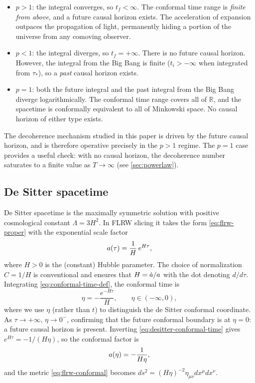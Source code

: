 \begin{itemize}[noitemsep]
  \item $p > 1$: the integral converges, so $t_{f} < \infty$.  The conformal
        time range is \emph{finite from above}, and a future causal horizon
        exists.  The acceleration of expansion outpaces the propagation of
        light, permanently hiding a portion of the universe from any
        comoving observer.
  \item $p < 1$: the integral diverges, so $t_{f} = +\infty$.  There is no
        future causal horizon.  However, the integral from the Big Bang is
        finite ($t_{i} > -\infty$ when integrated from $\tau_{*}$), so a
        \emph{past} causal horizon exists.
  \item $p = 1$: both the future integral and the past integral from the Big
        Bang diverge logarithmically.  The conformal time range covers all of
        $\mathbb{R}$, and the spacetime is conformally equivalent to all of
        Minkowski space.  No causal horizon of either type exists.
\end{itemize}

The decoherence mechanism studied in this paper is driven by the future causal
horizon, and is therefore operative precisely in the $p > 1$ regime.  The
$p = 1$ case provides a useful check: with no causal horizon, the decoherence
number saturates to a finite value as $T \to \infty$ (see
\cref{sec:powerlaw}).

\subsection{De Sitter spacetime}
\label{sec:flrw-desitter}

De Sitter spacetime is the maximally symmetric solution with positive
cosmological constant $\Lambda = 3H^{2}$.  In FLRW slicing it takes the form
\cref{eq:flrw-proper} with the exponential scale factor
%
\begin{equation}
  a(\tau) = \frac{1}{H}\,e^{H\tau} ,
  \label{eq:scale-factor-desitter}
\end{equation}
%
where $H > 0$ is the (constant) Hubble parameter.  The choice of
normalization $C = 1/H$ is conventional and ensures that $H = \dot{a}/a$
with the dot denoting $d/d\tau$.  Integrating \cref{eq:conformal-time-def},
the conformal time is
%
\begin{equation}
  \eta = -\frac{e^{-H\tau}}{H} , \qquad \eta \in (-\infty, 0) ,
  \label{eq:desitter-conformal-time}
\end{equation}
%
where we use $\eta$ (rather than $t$) to distinguish the de Sitter conformal
coordinate.  As $\tau \to +\infty$, $\eta \to 0^{-}$, confirming that the
future conformal boundary is at $\eta = 0$: a future causal horizon is
present.  Inverting \cref{eq:desitter-conformal-time} gives
$e^{H\tau} = -1/(H\eta)$, so the conformal factor is
%
\begin{equation}
  a(\eta) = -\frac{1}{H\eta} ,
  \label{eq:desitter-conformal-factor}
\end{equation}
%
and the metric \cref{eq:flrw-conformal} becomes $ds^{2} = (H\eta)^{-2}\eta_{\mu\nu}dx^{\mu}dx^{\nu}$.

